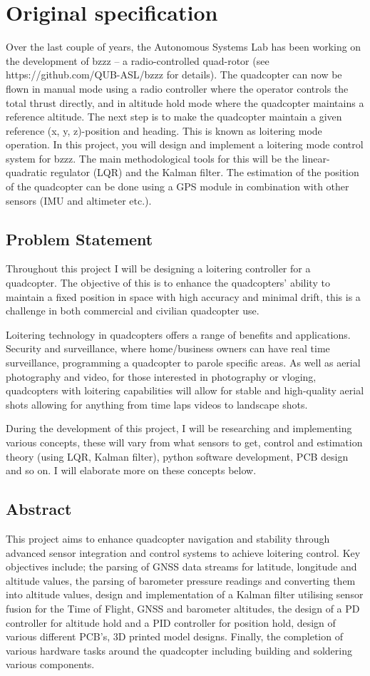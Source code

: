 \documentclass{report}
\begin{document}
\section*{Original specification}
Over the last couple of years, the Autonomous Systems Lab has been working on
the development of bzzz – a radio-controlled quad-rotor (see
https://github.com/QUB-ASL/bzzz for details). The quadcopter can now be flown in
manual mode using a radio controller where the operator controls the total
thrust directly, and in altitude hold mode where the quadcopter maintains a
reference altitude. The next step is to make the quadcopter maintain a given
reference (x, y, z)-position and heading. This is known as loitering mode
operation. In this project, you will design and implement a loitering mode
control system for bzzz. The main methodological tools for this will be the
linear-quadratic regulator (LQR) and the Kalman filter. The estimation of the
position of the quadcopter can be done using a GPS module in combination with
other sensors (IMU and altimeter etc.).
\subsection*{Problem Statement}
Throughout this project I will be designing a loitering controller for a
quadcopter. The objective of this is to enhance the quadcopters' ability to
maintain a fixed position in space with high accuracy and minimal drift, this is
a challenge in both commercial and civilian quadcopter use.

Loitering technology in quadcopters offers a range of benefits and applications.
Security and surveillance, where home/business owners can have real time
surveillance, programming a quadcopter to parole specific areas. As well as
aerial photography and video, for those interested in photography or vloging,
quadcopters with loitering capabilities will allow for stable and high-quality aerial
shots allowing for anything from time laps videos to landscape shots.

During the development of this project, I will be researching and implementing
various concepts, these will vary from what sensors to get, control and
estimation theory (using LQR, Kalman filter), python software development, PCB
design and so on. I will elaborate more on these concepts below.

\subsection*{Abstract}
This project aims to enhance quadcopter navigation and stability through advanced sensor integration and control systems to achieve loitering control. Key objectives include; the parsing of GNSS data streams for latitude, longitude and altitude values, the parsing of barometer pressure readings and converting them into altitude values, design and implementation of a Kalman filter utilising sensor fusion for the Time of Flight, GNSS and barometer altitudes, the design of a PD controller for altitude hold and a PID controller for position hold, design of various different PCB's, 3D printed model designs. Finally, the completion of various hardware tasks around the quadcopter including building and soldering various components.
\end{document}
